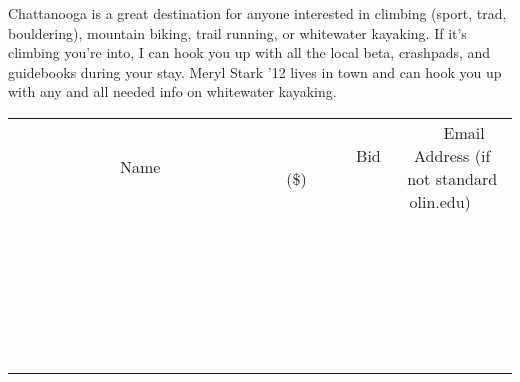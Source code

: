 \documentclass[11pt]{article}
\begin{document}
Chattanooga is a great destination for anyone interested in climbing (sport, trad, bouldering), mountain biking, trail running, or whitewater kayaking. If it's climbing you're into, I can hook you up with all the local beta, crashpads, and guidebooks during your stay. Meryl Stark '12 lives in town and can hook you up with any and all needed info on whitewater kayaking. \\[6ex]
\begin{tabular}{c c c}
~~~~~~~~~~~~~Name~~~~~~~~~~~~~ & ~~~~~~~~~Bid (\$)~~~~~~~~~ & ~~~Email Address (if not standard olin.edu)~~~ \\
 & & \\
\hline
 & & \\
\hline
 & & \\
\hline
 & & \\
\hline
 & & \\
\hline
 & & \\
\hline
 & & \\
\hline
 & & \\
\hline
 & & \\
\hline
 & & \\
\hline
 & & \\
\hline
 & & \\
\hline
 & & \\
\hline
 & & \\
\hline
 & & \\
\hline
 & & \\
\hline
 & & \\
\hline
 & & \\
\hline
 & & \\
\hline
 & & \\
\hline
 & & \\
\hline
 & & \\
\hline
 & & \\
\hline
 & & \\
\hline
 & & \\
\hline
 & & \\
\hline
\end{tabular}
\clearpage
\end{document}
